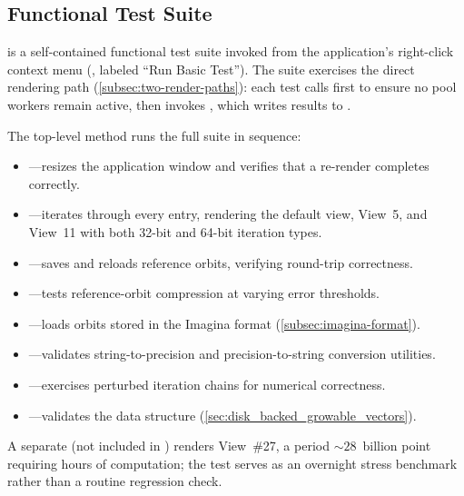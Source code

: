 \subsection{Functional Test Suite}
\label{subsec:crummy-test}

 is a self-contained functional test suite invoked
from the application's right-click context menu
(, labeled ``Run Basic Test'').  The suite
exercises the direct rendering path
(\cref{subsec:two-render-paths}): each test calls 
first to ensure no pool workers remain active, then invokes
, which writes results to .

The top-level  method runs the full suite in sequence:
\begin{itemize}
  \item {}---resizes the application window and
        verifies that a re-render completes correctly.
  \item {}---iterates through every
         entry, rendering the default view,
        View~5, and View~11 with both 32-bit and 64-bit iteration
        types.
  \item {}---saves and reloads reference orbits,
        verifying round-trip correctness.
  \item {}---tests reference-orbit
        compression at varying error thresholds.
  \item {}---loads orbits stored in the Imagina
        format (\cref{subsec:imagina-format}).
  \item {}---validates string-to-precision
        and precision-to-string conversion utilities.
  \item {}---exercises perturbed iteration
        chains for numerical correctness.
  \item {}---validates the
         data structure
        (\cref{sec:disk_backed_growable_vectors}).
\end{itemize}
A separate  (not included in
) renders View~\#27, a period ${\sim}28$~billion point
requiring hours of computation; the test serves as an overnight
stress benchmark rather than a routine regression check.

